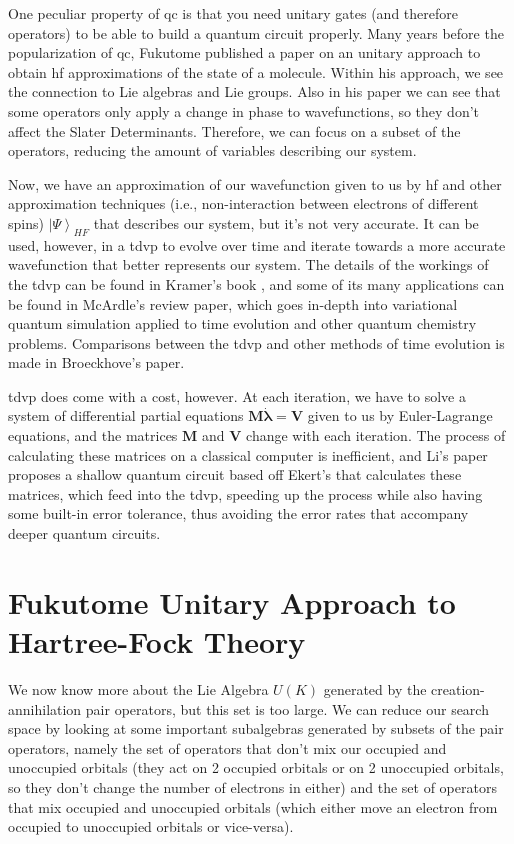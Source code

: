 \documentclass{aux/ttuthes2007}
\newcommand{\ket}[1]{\ensuremath{\left|#1\right\rangle}}
\newcommand{\orb}{K}
\begin{document}
	One peculiar property of \gls{qc} is that you need unitary gates (and therefore operators) to be able to build a quantum circuit properly. Many years before the popularization of \gls{qc}, Fukutome  published a paper on an unitary approach to obtain \gls{hf} approximations of the state of a molecule. Within his approach, we see the connection to Lie algebras and Lie groups. Also in his paper we can see that some operators only apply a change in phase to wavefunctions, so they don't affect the Slater Determinants. Therefore, we can focus on a subset of the operators, reducing the amount of variables describing our system.

	Now, we have an approximation of our wavefunction given to us by \gls{hf} and other approximation techniques (i.e., non-interaction between electrons of different spins) $\ket\Psi_{HF}$ that describes our system, but it's not very accurate. It can be used, however, in a \gls{tdvp} to evolve over time and iterate towards a more accurate wavefunction that better represents our system. The details of the workings of the \gls{tdvp} can be found in Kramer's book , and some of its many applications can be found in McArdle's  review paper, which goes in-depth into variational quantum simulation applied to time evolution and other quantum chemistry problems. Comparisons between the \gls{tdvp} and other methods of time evolution is made in Broeckhove's  paper.

	\gls{tdvp} does come with a cost, however. At each iteration, we have to solve a system of differential partial equations $\bm M \dot {\bm \lambda} = \bm V$ given to us by Euler-Lagrange equations, and the matrices $\bm M$ and $\bm V$ change with each iteration. The process of calculating these matrices on a classical computer is inefficient, and Li's paper  proposes a shallow quantum circuit based off Ekert's  that calculates these matrices, which feed into the \gls{tdvp}, speeding up the process while also having some built-in error tolerance, thus avoiding the error rates that accompany deeper quantum circuits.

\section {\textbf{Fukutome Unitary Approach to Hartree-Fock Theory}}

We now know more about the Lie Algebra $U(\orb)$ generated by the creation-annihilation pair operators, but this set is too large.
We can reduce our search space by looking at some important subalgebras generated by subsets of the pair operators, namely the set of operators that don't mix our occupied and unoccupied orbitals (they act on 2 occupied orbitals or on 2 unoccupied orbitals, so they don't change the number of electrons in either) and the set of operators that mix occupied and unoccupied orbitals (which either move an electron from occupied to unoccupied orbitals or vice-versa).
\end{document}

